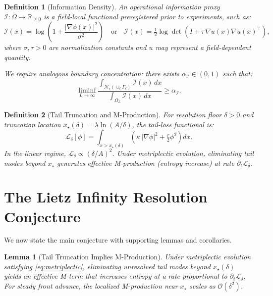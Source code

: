 \documentclass{article}
\newtheorem{lemma}{Lemma}
\newtheorem{definition}{Definition}
\begin{document}
\begin{definition}[Information Density]
An \emph{operational information proxy} $\mathcal{I} : \Omega \to \mathbb{R}_{\geq 0}$ is a field-local functional preregistered prior to experiments, such as:
\begin{equation}
\mathcal{I}(x) = \log\left(1 + \frac{|\nabla\phi(x)|^2}{\sigma^2}\right) \quad \text{or} \quad \mathcal{I}(x) = \tfrac{1}{2}\log\det\left(I + \tau\,\nabla u(x) \nabla u(x)^\top\right),
\end{equation}
where $\sigma, \tau > 0$ are normalization constants and $u$ may represent a field-dependent quantity.

We require analogous boundary concentration: there exists $\alpha_{\mathcal{I}} \in (0,1)$ such that:
\begin{equation}
\liminf_{L \to \infty} \frac{\int_{\mathcal{N}_\epsilon(\cup_\ell \Gamma_\ell)} \mathcal{I}(x)\, dx}{\int_{\Omega_L} \mathcal{I}(x)\, dx} \geq \alpha_{\mathcal{I}}.
\end{equation}
\end{definition}

\begin{definition}[Tail Truncation and M-Production]
For resolution floor $\delta > 0$ and truncation location $x_\star(\delta) = \lambda \ln(A/\delta)$, the \emph{tail-loss functional} is:
\begin{equation}
\mathcal{L}_\delta[\phi] = \int_{x > x_\star(\delta)} \left( \kappa\,|\nabla\phi|^2 + \tfrac{r}{2}\phi^2 \right) dx.
\end{equation}
In the linear regime, $\mathcal{L}_\delta \propto (\delta/A)^2$. Under metriplectic evolution, eliminating tail modes beyond $x_\star$ generates effective M-production (entropy increase) at rate $\partial_t \mathcal{L}_\delta$.
\end{definition}

\section{The Lietz Infinity Resolution Conjecture}
\label{sec:conjecture}

We now state the main conjecture with supporting lemmas and corollaries.

\begin{lemma}[Tail Truncation Implies M-Production]
\label{lem:tail_truncation}
Under metriplectic evolution satisfying \eqref{eq:metriplectic}, eliminating unresolved tail modes beyond $x_\star(\delta)$ yields an effective M-term that increases entropy at a rate proportional to $\partial_t \mathcal{L}_\delta$. For steady front advance, the localized M-production near $x_\star$ scales as $\mathcal{O}(\delta^2)$.
\end{lemma}
\end{document}
